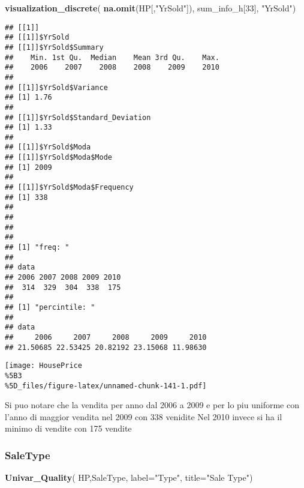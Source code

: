 \documentclass[
]{article}
\newenvironment{Shaded}{\begin{snugshade}}{\end{snugshade}}
\newcommand{\AttributeTok}[1]{\textcolor[rgb]{0.13,0.29,0.53}{#1}}
\newcommand{\DecValTok}[1]{\textcolor[rgb]{0.00,0.00,0.81}{#1}}
\newcommand{\FunctionTok}[1]{\textcolor[rgb]{0.13,0.29,0.53}{\textbf{#1}}}
\newcommand{\NormalTok}[1]{#1}
\newcommand{\StringTok}[1]{\textcolor[rgb]{0.31,0.60,0.02}{#1}}
\begin{document}
\begin{Shaded}
\begin{Highlighting}[]
\FunctionTok{visualization\_discrete}\NormalTok{(}
  \FunctionTok{na.omit}\NormalTok{(HP[,}\StringTok{"YrSold"}\NormalTok{]),}
\NormalTok{  sum\_info\_h[}\DecValTok{33}\NormalTok{],}
  \StringTok{"YrSold"}\NormalTok{)}
\end{Highlighting}
\end{Shaded}

\begin{verbatim}
## [[1]]
## [[1]]$YrSold
## [[1]]$YrSold$Summary
##    Min. 1st Qu.  Median    Mean 3rd Qu.    Max. 
##    2006    2007    2008    2008    2009    2010 
## 
## [[1]]$YrSold$Variance
## [1] 1.76
## 
## [[1]]$YrSold$Standard_Deviation
## [1] 1.33
## 
## [[1]]$YrSold$Moda
## [[1]]$YrSold$Moda$Mode
## [1] 2009
## 
## [[1]]$YrSold$Moda$Frequency
## [1] 338
## 
## 
## 
## 
## [1] "freq: "
## 
## data
## 2006 2007 2008 2009 2010 
##  314  329  304  338  175 
## 
## [1] "percintile: "
## 
## data
##     2006     2007     2008     2009     2010 
## 21.50685 22.53425 20.82192 23.15068 11.98630
\end{verbatim}

\texttt{[image: HousePrice\\\%5B3\\\%5D\_files/figure-latex/unnamed-chunk-141-1.pdf]}

Si puo notare che la vendita per anno dal 2006 a 2009 e per lo piu
uniforme con l'anno di maggior vendita nel 2009 con 338 venidite Nel
2010 invece si ha il minimo di vendite con 175 vendite

\subsubsection{SaleType}\label{saletype}

\begin{Shaded}
\begin{Highlighting}[]
\FunctionTok{Univar\_Quality}\NormalTok{(}
\NormalTok{  HP,SaleType,}
  \AttributeTok{label=}\StringTok{"Type"}\NormalTok{,}
  \AttributeTok{title=}\StringTok{"Sale Type"}\NormalTok{)}
\end{Highlighting}
\end{Shaded}
\end{document}
